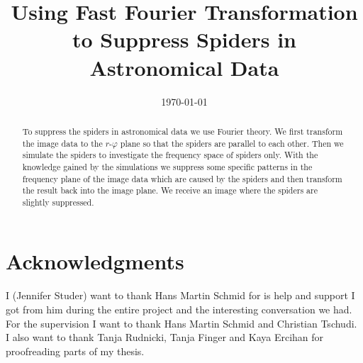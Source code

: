 \documentclass[a4paper,10pt,oneside, fleqn]{article}
\title{Using Fast Fourier Transformation to Suppress Spiders in Astronomical Data}
\date{\today}
\begin{document}
\maketitle

\pagestyle{fancy}               	%

\vspace*{\fill}
\begin{abstract}
To suppress the spiders in astronomical data we use Fourier theory. We first transform the image data to the $r$-$\varphi$ plane so that the spiders are parallel to each other. Then we simulate the spiders to investigate the frequency space of spiders only. With the knowledge gained by the simulations we suppress some specific patterns in the frequency plane of the image data which are caused by the spiders and then transform the result back into the image plane. We receive an image where the spiders are slightly suppressed. 
\end{abstract}
\vspace*{\fill}
\newpage

\tableofcontents
\newpage










\section{Acknowledgments}
I (Jennifer Studer) want to thank Hans Martin Schmid for is help and support I got from him during the entire project and the interesting conversation we had. For the supervision I want to thank Hans Martin Schmid and Christian Tschudi. I also want to thank Tanja Rudnicki, Tanja Finger and Kaya Ercihan for proofreading parts of my thesis. 

\newpage 

\appendix


\newpage


\end{document}
